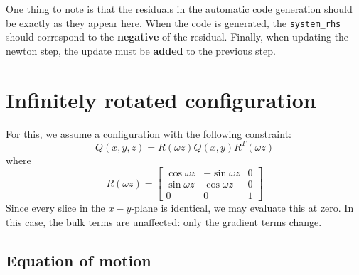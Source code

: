 \documentclass[reqno]{article}
\begin{document}
One thing to note is that the residuals in the automatic code generation should be exactly as they appear here.
When the code is generated, the \verb|system_rhs| should correspond to the \textbf{negative} of the residual.
Finally, when updating the newton step, the update must be \textbf{added} to the previous step.

\section{Infinitely rotated configuration}

For this, we assume a configuration with the following constraint:
\begin{equation}
    Q(x, y, z)
    =
    R(\omega z) Q(x, y) R^T(\omega z)
\end{equation}
where
\begin{equation}
    R(\omega z)
    =
    \begin{bmatrix}
\cos \omega z &-\sin \omega z &0 \\
        \sin \omega z &\cos \omega z &0 \\
        0 &0 &1
    \end{bmatrix}
\end{equation}
Since every slice in the $x-y$-plane is identical, we may evaluate this at zero.
In this case, the bulk terms are unaffected: only the gradient terms change.

\subsection{Equation of motion}
\end{document}
